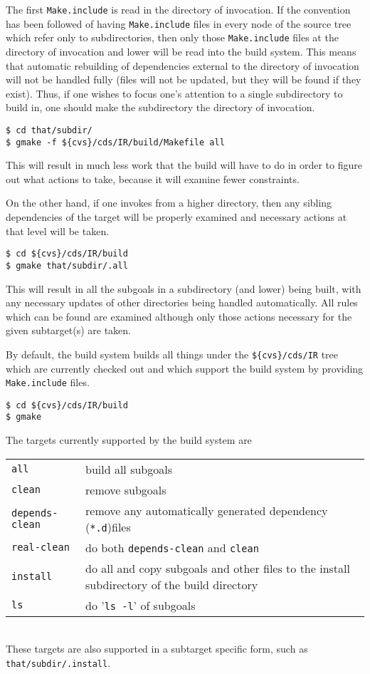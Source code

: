 \documentclass[letterpaper]{article}
\begin{document}
The first \verb+Make.include+ is read in the directory of invocation.
If the convention has been followed of having \verb+Make.include+
files in every node of the source tree which refer only to
subdirectories, then only those \verb+Make.include+ files at the
directory of invocation and lower will be read into the build system.
This means that automatic rebuilding of dependencies external to the
directory of invocation will not be handled fully (files will not be
updated, but they will be found if they exist).  Thus, if one wishes
to focus one's attention to a single subdirectory to build in, one
should make the subdirectory the directory of invocation.
\begin{verbatim}
$ cd that/subdir/
$ gmake -f ${cvs}/cds/IR/build/Makefile all
\end{verbatim}
This will result in much less work that the build will have to do in
order to figure out what actions to take, because it will examine fewer
constraints.

On the other hand, if one invokes from a higher directory, then
any sibling dependencies of the target will be properly examined and
necessary actions at that level will be taken.
\begin{verbatim}
$ cd ${cvs}/cds/IR/build
$ gmake that/subdir/.all
\end{verbatim}
This will result in all the subgoals in a subdirectory (and lower)
being built, with any necessary updates of other directories being
handled automatically.  All rules which can be found are examined
although only those actions necessary for the given subtarget(s) are
taken.

By default, the build system builds all things under the
\verb+${cvs}/cds/IR+ tree which are currently checked out and which
support the build system by providing \verb+Make.include+ files.
\begin{verbatim}
$ cd ${cvs}/cds/IR/build
$ gmake
\end{verbatim}

The targets currently supported by the build system are\\
\begin{tabular}{ll}
\verb+all+ & build all subgoals\\
\verb+clean+ & remove subgoals\\
\verb+depends-clean+ & remove any automatically generated dependency (\verb+*.d+)files\\
\verb+real-clean+ & do both \verb+depends-clean+ and \verb+clean+\\
\verb+install+ & do all and copy subgoals and other files to the install subdirectory of the build directory\\
\verb+ls+ & do '\verb+ls -l+' of subgoals\\
\end{tabular}\\
These targets are also supported in a subtarget specific form, such as
\verb+that/subdir/.install+.
\end{document}
